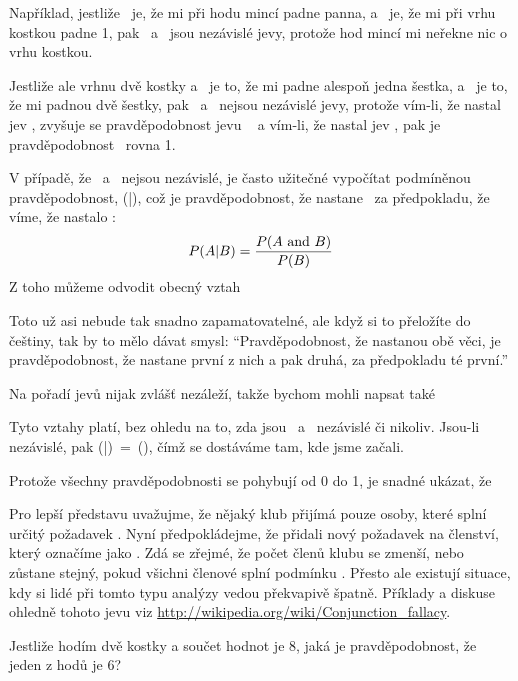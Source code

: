 \documentclass[12pt]{book}
\begin{document}
Například, jestliže \A~je, že mi při hodu mincí padne panna, a \B~je, že mi při vrhu kostkou padne 1, pak \A~a \B~jsou nezávislé jevy, protože hod mincí mi neřekne nic o vrhu kostkou.

Jestliže ale vrhnu dvě kostky a \A~je to, že mi padne alespoň jedna šestka, a \B~je to, že mi padnou dvě šestky, pak \A~a \B~nejsou nezávislé jevy, protože vím-li, že nastal jev \A, zvyšuje se pravděpodobnost jevu \B~ a vím-li, že nastal jev \B, pak je pravděpodobnost \A~rovna 1.

V případě, že \A~a \B~nejsou nezávislé, je často užitečné vypočítat podmíněnou pravděpodobnost, \Prob(\A|\B), což je pravděpodobnost, že nastane \A~za předpokladu, že víme, že nastalo \B:
%
\[ P(A|B) = \frac{P(A ~\mbox{and}~ B)}{P(B)} \]
%
Z toho můžeme odvodit obecný vztah

\Eqn{ \Prob(\A \AND \B) = \Prob(\A) \Prob(\B|\A) }

Toto už asi nebude tak snadno zapamatovatelné, ale když si to přeložíte do češtiny, tak by to mělo dávat smysl: ``Pravděpodobnost, že nastanou obě věci, je pravděpodobnost, že nastane první z nich a pak druhá, za předpokladu té první.''

Na pořadí jevů nijak zvlášť nezáleží, takže bychom mohli napsat také

\Eqn{ \Prob(\A \AND \B) = \Prob(\B) \Prob(\A|\B) }

Tyto vztahy platí, bez ohledu na to, zda jsou \A~a \B~nezávislé či nikoliv.
Jsou-li nezávislé, pak \Prob(\A|\B)~=~\Prob(\A), čímž se dostáváme tam, kde jsme začali.

Protože všechny pravděpodobnosti se pohybují od 0 do 1, je snadné ukázat, že

\Eqn{ \Prob(\A \AND \B)~\myle~\Prob(\A) }

Pro lepší představu uvažujme, že nějaký klub přijímá pouze osoby, které splní určitý požadavek \A.  Nyní předpokládejme, že přidali nový požadavek na členství, který označíme jako \B.  Zdá se zřejmé, že počet členů klubu se zmenší, nebo zůstane stejný, pokud všichni členové splní podmínku \B.  Přesto ale existují situace, kdy si lidé při tomto typu analýzy vedou překvapivě špatně. Příklady a diskuse ohledně tohoto jevu viz \url{http://wikipedia.org/wiki/Conjunction_fallacy}.

\begin{exercise}
Jestliže hodím dvě kostky a součet hodnot je 8, jaká je pravděpodobnost, že jeden z hodů je 6?

\end{exercise}
\end{document}
